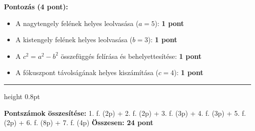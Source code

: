 \documentclass[11pt, a4paper]{article}
\begin{document}
{\color{muted}\small\textbf{Pontozás (4 pont):}}
\begin{itemize}
    \item {\color{muted}\small A nagytengely felének helyes leolvasása ($a = 5$): \textbf{1 pont}}
    \item {\color{muted}\small A kistengely felének helyes leolvasása ($b = 3$): \textbf{1 pont}}
    \item {\color{muted}\small A $c^2 = a^2 - b^2$ összefüggés felírása és behelyettesítése: \textbf{1 pont}}
\item {\color{muted}\small A fókuszpont távolságának helyes kiszámítása ($c = 4$): \textbf{1 pont}}
\end{itemize}

\vfill
{\color{primary}\hrule height 0.8pt}
\vspace{4pt}
{\color{muted}\small\textbf{Pontszámok összesítése:} 1. f. (2p) + 2. f. (2p) + 3. f. (3p) + 4. f. (3p) + 5. f. (2p) + 6. f. (8p) + 7. f. (4p) \hfill \textbf{Összesen: 24 pont}}
\end{document}
